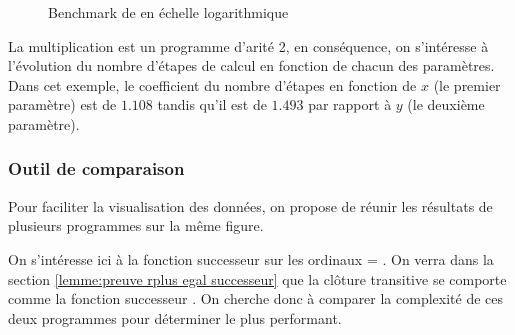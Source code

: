 \documentclass[a4paper, 11pt]{article}
\begin{document}
\begin{figure}[H]
        \begin{center}
            \caption{Benchmark de \protect{} en échelle logarithmique}
        \end{center}
\end{figure}

La multiplication est un programme d'arité 2, en conséquence, on s'intéresse à l'évolution
du nombre d'étapes de calcul en fonction de chacun des paramètres. Dans cet exemple, le coefficient
du nombre d'étapes en fonction de $x$ (le premier paramètre) est de $1.108$ tandis qu'il est de $1.493$
par rapport à $y$ (le deuxième paramètre).

\subsubsection{Outil de comparaison} 

Pour faciliter la visualisation des données, on propose de réunir les
résultats de plusieurs programmes sur la même figure.

On s'intéresse ici à la fonction successeur sur les ordinaux  = .
On verra dans la section \ref{lemme:preuve rplus egal successeur} que la clôture transitive 
se comporte comme la fonction successeur . 
On cherche donc à comparer la complexité de ces deux programmes pour déterminer le plus performant.
\end{document}
